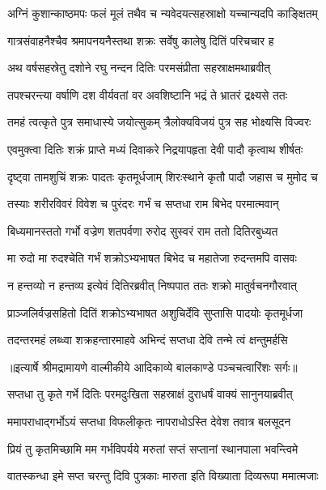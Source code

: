 \twolineshloka
{अग्निं कुशान्काष्ठमपः फलं मूलं तथैव च}
{न्यवेदयत्सहस्राक्षो यच्चान्यदपि काङ्क्षितम्} %

\twolineshloka
{गात्रसंवाहनैश्चैव श्रमापनयनैस्तथा}
{शक्रः सर्वेषु कालेषु दितिं परिचचार ह} %

\twolineshloka
{अथ वर्षसहस्रेतु दशोने रघु नन्दन}
{दितिः परमसंप्रीता सहस्राक्षमथाब्रवीत्} %

\twolineshloka
{तपश्चरन्त्या वर्षाणि दश वीर्यवतां वर}
{अवशिष्टानि भद्रं ते भ्रातरं द्रक्ष्यसे ततः} %

\twolineshloka
{तमहं त्वत्कृते पुत्र समाधास्ये जयोत्सुकम्}
{त्रैलोक्यविजयं पुत्र सह भोक्ष्यसि विज्वरः} %

\twolineshloka
{एवमुक्त्वा दितिः शक्रं प्राप्ते मध्यं दिवाकरे}
{निद्रयापहृता देवी पादौ कृत्वाथ शीर्षतः} %

\twolineshloka
{दृष्ट्वा तामशुचिं शक्रः पादतः कृतमूर्धजाम्}
{शिरःस्थाने कृतौ पादौ जहास च मुमोद च} %

\twolineshloka
{तस्याः शरीरविवरं विवेश च पुरंदरः}
{गर्भं च सप्तधा राम बिभेद परमात्मवान्} %

\twolineshloka
{बिध्यमानस्ततो गर्भो वज्रेण शतपर्वणा}
{रुरोद सुस्वरं राम ततो दितिरबुध्यत} %

\twolineshloka
{मा रुदो मा रुदश्चेति गर्भं शक्रोऽभ्यभाषत}
{बिभेद च महातेजा रुदन्तमपि वासवः} %

\twolineshloka
{न हन्तव्यो न हन्तव्य इत्येवं दितिरब्रवीत्}
{निष्पपात ततः शक्रो मातुर्वचनगौरवात्} %

\twolineshloka
{प्राञ्जलिर्वज्रसहितो दितिं शक्रोऽभ्यभाषत}
{अशुचिर्देवि सुप्तासि पादयोः कृतमूर्धजा} %

\twolineshloka
{तदन्तरमहं लब्ध्वा शक्रहन्तारमाहवे}
{अभिन्दं सप्तधा देवि तन्मे त्वं क्षन्तुमर्हसि} %


{॥इत्यार्षे श्रीमद्रामायणे वाल्मीकीये आदिकाव्ये बालकाण्डे पञ्चचत्वारिंशः सर्गः॥}


\twolineshloka
{सप्तधा तु कृते गर्भे दितिः परमदुःखिता}
{सहस्राक्षं दुराधर्षं वाक्यं सानुनयाब्रवीत्} %

\twolineshloka
{ममापराधाद्गर्भोऽयं सप्तधा विफलीकृतः}
{नापराधोऽस्ति देवेश तवात्र बलसूदन} %

\twolineshloka
{प्रियं तु कृतमिच्छामि मम गर्भविपर्यये}
{मरुतां सप्तं सप्तानां स्थानपाला भवन्त्विमे} %

\twolineshloka
{वातस्कन्धा इमे सप्त चरन्तु दिवि पुत्रकाः}
{मारुता इति विख्याता दिव्यरूपा ममात्मजाः} %

